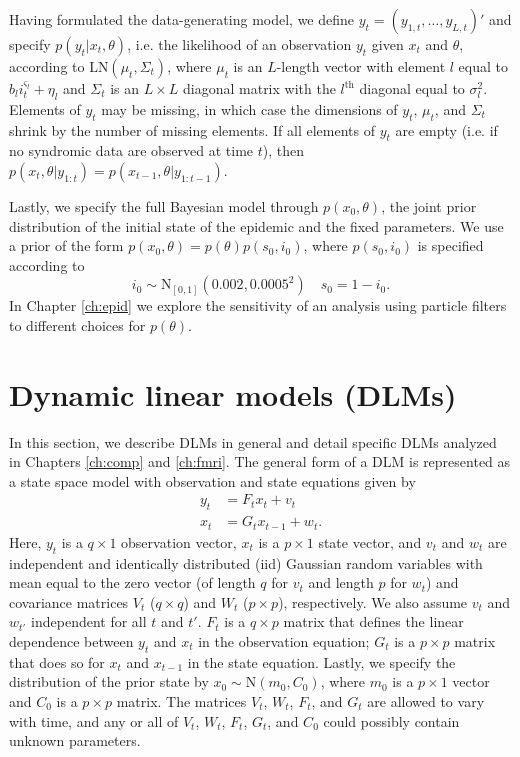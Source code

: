 Having formulated the data-generating model, we define $y_t = (y_{1,t},\ldots,y_{L,t})'$ and specify $p(y_t|x_t,\theta)$, i.e. the likelihood of an observation $y_t$ given $x_t$ and $\theta$, according to $\mbox{LN}(\mu_t,\Sigma_t)$, where $\mu_t$ is an $L$-length vector with element $l$ equal to $b_li_t^{\varsigma_l} + \eta_l$ and $\Sigma_t$ is an $L \times L$ diagonal matrix with the $l^{\mbox{th}}$ diagonal equal to $\sigma_l^2$. Elements of $y_t$ may be missing, in which case the dimensions of $y_t$, $\mu_t$, and $\Sigma_t$ shrink by the number of missing elements. If all elements of $y_t$ are empty (i.e. if no syndromic data are observed at time $t$), then $p(x_t,\theta|y_{1:t})=p(x_{t-1},\theta|y_{1:t-1})$.

Lastly, we specify the full Bayesian model through $p(x_0, \theta)$, the joint prior distribution of the initial state of the epidemic and the fixed parameters. We use a prior of the form $p(x_0,\theta) = p(\theta)p(s_0,i_0)$, where $p(s_0,i_0)$ is specified according to
\begin{equation}
i_0 \sim \mbox{N}_{[0,1]}(0.002,0.0005^2) \quad s_0 = 1 - i_0. \label{eqn:epid:prior:state}
\end{equation}
In Chapter \ref{ch:epid} we explore the sensitivity of an analysis using particle filters to different choices for $p(\theta)$.

\section{Dynamic linear models (DLMs) \label{sec:dlm}}

In this section, we describe DLMs in general and detail specific DLMs analyzed in Chapters \ref{ch:comp} and \ref{ch:fmri}. The general form of a DLM is represented as a state space model with observation and state equations given by
\begin{align}
y_t &= F_tx_t + v_t \label{eqn:dlm:obs} \\
x_t &= G_tx_{t-1} + w_t. \label{eqn:dlm:state}
\end{align}
Here, $y_t$ is a $q \times 1$ observation vector, $x_t$ is a $p \times 1$ state vector, and $v_t$ and $w_t$ are independent and identically distributed (iid) Gaussian random variables with mean equal to the zero vector (of length $q$ for $v_t$ and length $p$ for $w_t$) and covariance matrices $V_t$ ($q \times q$) and $W_t$ ($p \times p$), respectively. We also assume $v_t$ and $w_{t'}$ independent for all $t$ and $t'$. $F_t$ is a $q \times p$ matrix that defines the linear dependence between $y_t$ and $x_t$ in the observation equation; $G_t$ is a $p \times p$ matrix that does so for $x_t$ and $x_{t-1}$ in the state equation. Lastly, we specify the distribution of the prior state by $x_0 \sim \mbox{N}(m_0, C_0)$, where $m_0$ is a $p \times 1$ vector and $C_0$ is a $p \times p$ matrix. The matrices $V_t$, $W_t$, $F_t$, and $G_t$ are allowed to vary with time, and any or all of $V_t$, $W_t$, $F_t$, $G_t$, and $C_0$ could possibly contain unknown parameters.

